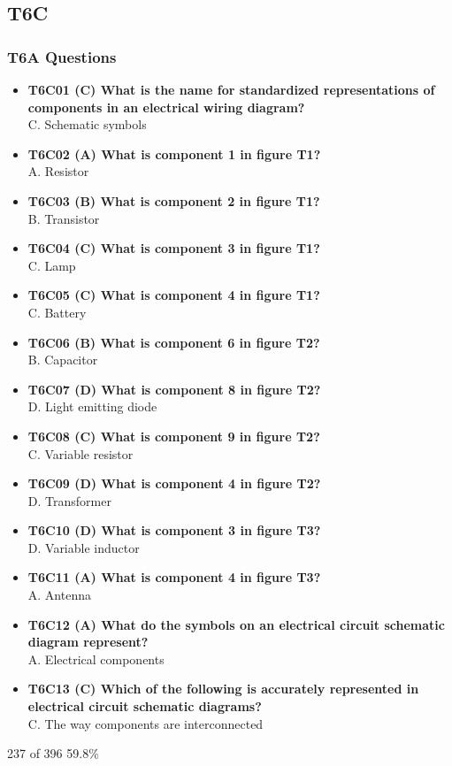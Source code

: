 \documentclass[10pt]{beamer}
\begin{document}
\subsection{T6C}
\begin{frame}
\frametitle{T6A Questions}
\tiny
\begin{itemize}[<+->]
\item\textbf{T6C01 (C) What is the name for standardized representations of components in an electrical wiring diagram?}\\C. Schematic symbols
\item\textbf{T6C02 (A) What is component 1 in figure T1?}\\A. Resistor
\item\textbf{T6C03 (B) What is component 2 in figure T1?}\\B. Transistor
\item\textbf{T6C04 (C) What is component 3 in figure T1?}\\C. Lamp
\item\textbf{T6C05 (C) What is component 4 in figure T1?}\\C. Battery
\item\textbf{T6C06 (B) What is component 6 in figure T2?}\\B. Capacitor
\item\textbf{T6C07 (D) What is component 8 in figure T2?}\\D. Light emitting diode
\item\textbf{T6C08 (C) What is component 9 in figure T2?}\\C. Variable resistor
\item\textbf{T6C09 (D) What is component 4 in figure T2?}\\D. Transformer
\item\textbf{T6C10 (D) What is component 3 in figure T3?}\\D. Variable inductor
\item\textbf{T6C11 (A) What is component 4 in figure T3?}\\A. Antenna
\item\textbf{T6C12 (A) What do the symbols on an electrical circuit schematic diagram represent?}\\A. Electrical components
\item\textbf{T6C13 (C) Which of the following is accurately represented in electrical circuit schematic diagrams?}\\C. The way components are interconnected
\end{itemize}
\tiny 237 of 396  59.8\%
\end{frame}
\end{document}
